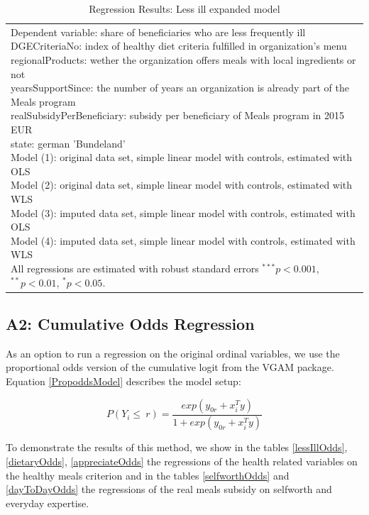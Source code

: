 \documentclass[12pt, a4paper, titlepage]{article}\usepackage[]{graphicx}\usepackage[]{color}
\begin{document}
\begin{table}
\begin{center}
{\begin{tabular}{l c c c c }
\hline
\multicolumn{5}{l}{\scriptsize{\parbox{\linewidth}
{\vspace{2pt} Dependent variable: share of beneficiaries who are less frequently ill \\ DGECriteriaNo: index of healthy diet criteria fulfilled in organization's menu \\ regionalProducts: wether the organization offers meals with local ingredients or not \\ yearsSupportSince: the number of years an organization is already part of the Meals program \\ realSubsidyPerBeneficiary: subsidy per beneficiary of Meals program in 2015 EUR \\ state: german 'Bundeland' \\ Model (1): original data set, simple linear model with controls, estimated with OLS \\ Model (2): original data set, simple linear model with controls, estimated with WLS \\ Model (3): imputed data set, simple linear model with controls, estimated with OLS \\ Model (4): imputed data set, simple linear model with controls, estimated with WLS \\ All regressions are estimated with robust standard errors $^{***}p<0.001$, $^{**}p<0.01$, $^*p<0.05$.}}}
\end{tabular}
}
\caption{Regression Results: Less ill expanded model}
\label{expandLessIll}
\end{center}
\end{table}


\subsection{A2: Cumulative Odds Regression} 

As an option to run a regression on the original ordinal variables, we use the proportional odds version of the cumulative logit from the VGAM package. Equation \ref{PropoddsModel} describes the model setup: 

 
\begin{equation}
\label{PropoddsModel}
  P(Y_i \leq \ r) = \frac{exp(y_{0r} + x_i^Ty)}{1+exp(y_{0r} + x_i^Ty)}    
\end{equation}


To demonstrate the results of this method, we show in the tables \ref{lessIllOdds}, \ref{dietaryOdds}, \ref{appreciateOdds} the regressions of the health related variables on the healthy meals criterion and in the tables \ref{selfworthOdds} and \ref{dayToDayOdds} the regressions of the real meals subsidy on selfworth and everyday expertise. 
\end{document}
